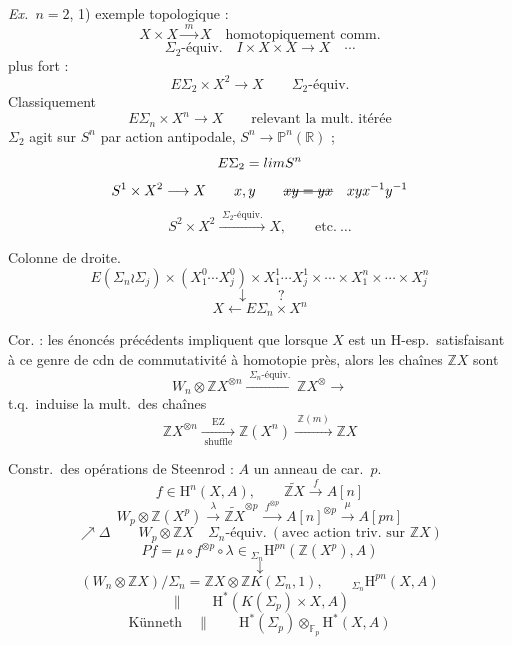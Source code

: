 \documentclass[11pt,a4paper]{article}
\begin{document}
\emph{Ex.\ $n = 2$}, 1) exemple topologique :
\[
X \times X \xrightarrow{\;m\;} X \quad \text{homotopiquement comm.}
\]
\[
\Sigma_2\text{-équiv.} \quad I \times X \times X \longrightarrow X \quad \cdots
\]
plus fort :
\[
E\Sigma_2 \times X^2 \longrightarrow X \qquad \Sigma_2\text{-équiv.}
\]
Classiquement
\[
E\Sigma_n \times X^n \longrightarrow X \qquad \text{relevant la mult.\ itérée}
\]
$\Sigma_2$ agit sur $S^n$ par action antipodale, $S^n \to \mathbb{P}^n(\mathbb{R})$ ;
\[
E\Sigma_2 = \varinjlim S^n
\]
\[
S^1 \times X^2 \longrightarrow X \qquad x , y \qquad \text{\struck{$xy = yx$}} \quad x y x^{-1} y^{-1}
\]
\[
S^2 \times X^2 \xrightarrow{\;\Sigma_2\text{-équiv.}\;} X , \qquad \text{etc.}\ \ldots
\]

Colonne de droite.
\[
E(\Sigma_n \wr \Sigma_j) \times (X_1^0 \cdots X_j^0) \times X_1^1 \cdots X_j^1 \times \cdots \times X_1^n \times \cdots \times X_j^n
\]
\[
\downarrow \qquad ?
\]
\[
X \longleftarrow E\Sigma_n \times X^n
\]

Cor. : les énoncés précédents impliquent que lorsque $X$ est un H-esp.\ satisfaisant à ce genre de cdn de commutativité à homotopie près, alors les chaînes $\mathbb{Z}X$ sont 
\[
W_n \otimes \mathbb{Z}X^{\otimes n} \xrightarrow{\;\Sigma_n\text{-équiv.}\;} \mathbb{Z}X^{\otimes} \longrightarrow
\]
t.q.\ induise la mult.\ des chaînes
\[
\mathbb{Z}X^{\otimes n} \xrightarrow[\;\text{shuffle}\;]{\;\mathrm{EZ}\;} \mathbb{Z}(X^n) \xrightarrow{\;\mathbb{Z}(m)\;} \mathbb{Z}X
\]

Constr.\ des opérations de Steenrod : $A$ un anneau de car.\ $p$. 
\[
f \in \mathrm{H}^n(X , A) , \qquad \widetilde{\mathbb{Z}X} \xrightarrow{\;f\;} A[n]
\]
\[
W_p \otimes \mathbb{Z}(X^p) \xrightarrow{\;\lambda\;} \widetilde{\mathbb{Z}X}^{\otimes p} \xrightarrow{\;f^{\otimes p}\;} A[n]^{\otimes p} \xrightarrow{\;\mu\;} A[pn]
\]
\[
\nearrow \Delta \qquad W_p \otimes \mathbb{Z}X \quad \Sigma_n\text{-équiv.}\ (\text{avec action triv.\ sur } \mathbb{Z}X)
\]
\[
Pf = \mu \circ f^{\otimes p} \circ \lambda \in {}_{\Sigma_n}\mathrm{H}^{pn}(\mathbb{Z}(X^p) , A)
\]
\[
\downarrow
\]
\[
(W_n \otimes \mathbb{Z}X)/\Sigma_n = \mathbb{Z}X \otimes \mathbb{Z}K(\Sigma_n , 1) ,
\qquad
{}_{\Sigma_n}\mathrm{H}^{pn}(X , A)
\]
\[
\| \qquad \mathrm{H}^*(K(\Sigma_p) \times X , A)
\]
\[
\text{Künneth} \quad \| \qquad \mathrm{H}^*(\Sigma_p) \otimes_{\mathbb{F}_p} \mathrm{H}^*(X , A)
\]
\end{document}
